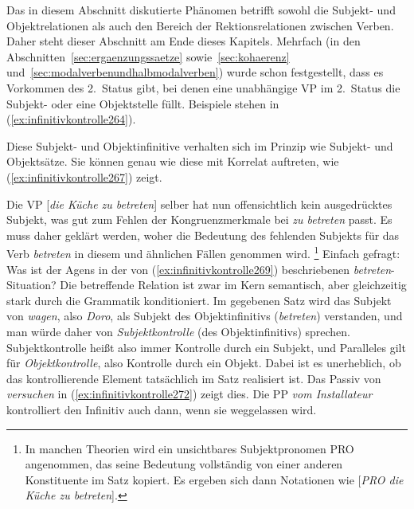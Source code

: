 
Das in diesem Abschnitt diskutierte Phänomen betrifft sowohl die Subjekt- und Objektrelationen als auch den Bereich der Rektionsrelationen zwischen Verben.
Daher steht dieser Abschnitt am Ende dieses Kapitels.
Mehrfach (\zB in den Abschnitten~\ref{sec:ergaenzungssaetze} sowie~\ref{sec:kohaerenz} und~\ref{sec:modalverbenundhalbmodalverben}) wurde schon festgestellt, dass es Vorkommen des 2.~Status gibt, bei denen eine unabhängige VP im 2.~Status \zB die Subjekt- oder eine Objektstelle füllt.
Beispiele stehen in (\ref{ex:infinitivkontrolle264}).


\begin{exe}
  \ex\label{ex:infinitivkontrolle264}
  \begin{xlist}
  \end{xlist}
\end{exe}


Diese Subjekt- und Objektinfinitive verhalten sich im Prinzip wie Subjekt- und Objektsätze.
Sie können genau wie diese mit Korrelat auftreten, wie (\ref{ex:infinitivkontrolle267}) zeigt.

\begin{exe}
  \ex\label{ex:infinitivkontrolle267}
  \begin{xlist}
  \end{xlist}
\end{exe}

Die VP [\textit{die Küche zu betreten}] selber hat nun offensichtlich kein ausgedrücktes Subjekt, was gut zum Fehlen der Kongruenzmerkmale bei \textit{zu betreten} passt.
Es muss daher geklärt werden, woher die Bedeutung des fehlenden Subjekts für das Verb \textit{betreten} in diesem und ähnlichen Fällen genommen wird.%
\footnote{In manchen Theorien wird ein unsichtbares Subjektpronomen PRO angenommen, das seine Bedeutung vollständig von einer anderen Konstituente im Satz kopiert.
Es ergeben sich dann Notationen wie [\textit{PRO die Küche zu betreten}].}
Einfach gefragt:
Was ist der Agens in der von (\ref{ex:infinitivkontrolle269}) beschriebenen \textit{betreten}-Situation?
Die betreffende Relation ist zwar im Kern semantisch, aber gleichzeitig stark durch die Grammatik konditioniert.
Im gegebenen Satz wird das Subjekt von \textit{wagen}, also \textit{Doro}, als Subjekt des Objektinfinitivs (\textit{betreten}) verstanden, und man würde daher von \textit{Subjektkontrolle} (des Objektinfinitivs) sprechen.
Subjektkontrolle heißt also immer Kontrolle durch ein Subjekt, und Paralleles gilt für \textit{Objektkontrolle}, also Kontrolle durch ein Objekt.
Dabei ist es unerheblich, ob das kontrollierende Element tatsächlich im Satz realisiert ist.
Das Passiv von \textit{versuchen} in (\ref{ex:infinitivkontrolle272}) zeigt dies.
Die PP \textit{vom Installateur} kontrolliert den Infinitiv auch dann, wenn sie weggelassen wird.

